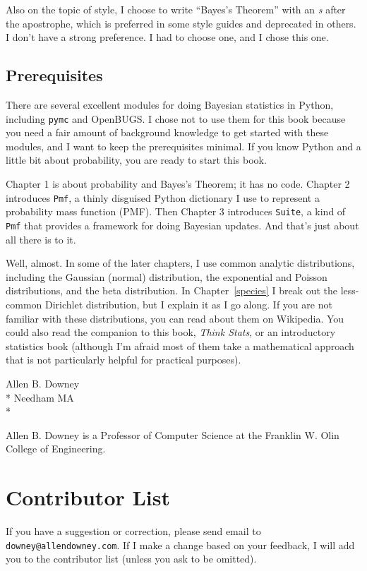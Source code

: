 \documentclass[12pt]{book}
\begin{document}
Also on the topic of style, I choose to write ``Bayes's Theorem''
with an {\it s} after the apostrophe, which is preferred in some
style guides and deprecated in others.  I don't have a strong
preference.  I had to choose one, and I chose this one.


\subsection*{Prerequisites}

There are several excellent modules for doing Bayesian statistics in
Python, including {\tt pymc} and OpenBUGS.  I chose not to use them
for this book because you need a fair amount of background knowledge
to get started with these modules, and I want to keep the
prerequisites minimal.  If you know Python and a little bit about
probability, you are ready to start this book.

Chapter 1 is about probability and Bayes's Theorem; it has no code.
Chapter 2 introduces {\tt Pmf}, a thinly disguised Python dictionary
I use to represent a probability mass function (PMF).  Then
Chapter 3 introduces {\tt Suite}, a kind of {\tt Pmf} that provides
a framework for doing Bayesian updates.  And that's just about
all there is to it.

Well, almost.  In some of the later chapters, I use common
analytic distributions, including the Gaussian (normal) distribution,
the exponential and Poisson distributions, and the beta distribution.
In Chapter~\ref{species} I break out the less-common Dirichlet
distribution, but I explain it as I go along.  If you are not familiar
with these distributions, you can read about them on Wikipedia.  You
could also read the companion to this book, {\it Think Stats}, or an
introductory statistics book (although I'm afraid most of them take
a mathematical approach that is not particularly helpful for practical
purposes).


Allen B. Downey \\*
Needham MA \\*

Allen B. Downey is a Professor of Computer Science at 
the Franklin W. Olin College of Engineering.



\section*{Contributor List}

If you have a suggestion or correction, please send email to 
{\tt downey@allendowney.com}.  If I make a change based on your
feedback, I will add you to the contributor list
(unless you ask to be omitted).
\end{document}
